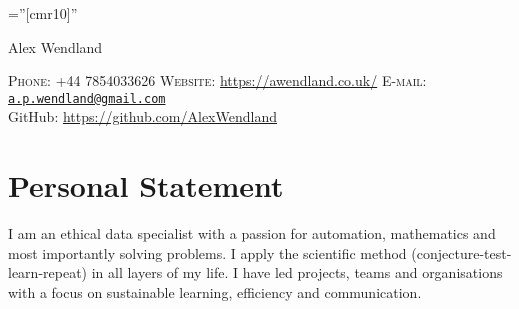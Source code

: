 \documentclass[a4paper,10pt]{article}
\begin{document}
\pagestyle{empty} %

\font\fb=''[cmr10]'' %

\par{\centering
		{\Huge Alex Wendland
	}\bigskip\par}
\vspace{-0.3 cm}
\begin{center}
	\textsc{Phone:} +44 7854033626 \hspace{1cm} \textsc{Website:} \href{https://awendland.co.uk/}{https://awendland.co.uk/} \hspace{1cm} \textsc{E-mail:} \href{mailto:a.p.wendland@gmail.com}{\texttt{a.p.wendland@gmail.com}}\\
	GitHub: \href{https://github.com/AlexWendland}{https://github.com/AlexWendland}
\end{center}

\section{Personal Statement}
I am an ethical data specialist with a passion for automation, mathematics and most importantly solving problems. I apply the scientific method (conjecture-test-learn-repeat) in all layers of my life. I have led projects, teams and organisations with a focus on sustainable learning, efficiency and communication.
\end{document}

